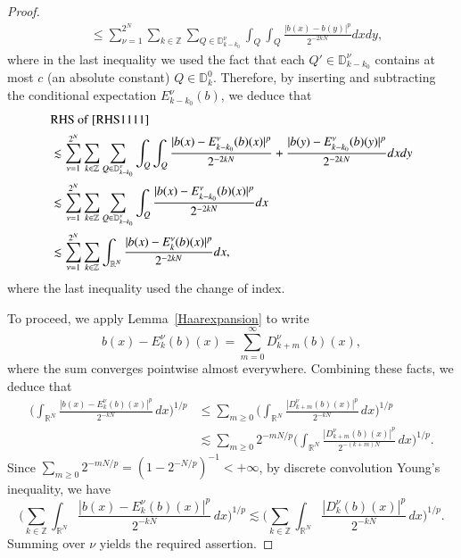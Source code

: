 \documentclass[12pt]{amsart}
\begin{document}
\begin{proof}
\begin{align}
   &\leq \sum_{\nu=1}^{2^N}\sum_{k\in\mathbb{Z}}\sum_{Q\in\mathbb{D}_{k-k_0}^\nu}\int_{Q}\int_{Q}\frac{|b(x)-b(y)|^p}{2^{-2kN}}dxdy,
\end{align}
where in the last inequality we used the fact that each $Q'\in \mathbb{D}_{k-k_0}^\nu$ contains at most $c$ (an absolute constant) $Q\in\mathbb{D}_k^0$. 
Therefore, by inserting and subtracting the conditional expectation $E_{k-k_0}^\nu(b)$, we deduce that
\begin{align}
  &{\rm RHS}\ {\rm of}\ \eqref{RHS1111}\nonumber\\
  &\lesssim \sum_{\nu=1}^{2^N}\sum_{k\in\mathbb{Z}}\sum_{Q\in\mathbb{D}_{k-k_0}^\nu}\int_{Q}\int_{Q}\frac{|b(x)-E_{k-k_0}^\nu(b)(x)|^p}{2^{-2kN}}+\frac{|b(y)-E_{k-k_0}^\nu(b)(y)|^p}{2^{-2kN}}dxdy\nonumber\\
  &\lesssim\sum_{\nu=1}^{2^N}\sum_{k\in\mathbb{Z}}\sum_{Q\in\mathbb{D}_{k-k_0}^\nu}\int_{Q}\frac{|b(x)-E_{k-k_0}^\nu(b)(x)|^p}{2^{-2kN}}dx\nonumber\\
  &\lesssim\sum_{\nu=1}^{2^N}\sum_{k\in\mathbb{Z}}\int_{\mathbb{R}^N}\frac{|b(x)-E_{k}^\nu(b)(x)|^p}{2^{-2kN}}dx,
\end{align}
where the last inequality used the change of index.

To proceed, we apply  Lemma~\ref{Haarexpansion} to write
\[
b(x)-E_k^\nu (b)(x)=\sum_{m=0}^{\infty}D_{k+m}^\nu (b)(x),
\]
 where the sum converges pointwise almost everywhere. 
Combining these facts, we deduce that
\begin{align}\label{eq:A-k-new}
\Bigg(\int_{\mathbb{R}^N}\frac{|b(x)-E_k^\nu (b)(x)|^p}{2^{-kN}}\,dx\Bigg)^{\!1/p}
&\le \sum_{m\ge0}
\Bigg(\int_{\mathbb{R}^N}\frac{|D_{k+m}^\nu (b)(x)|^p}{2^{-kN}}\,dx\Bigg)^{\!1/p}\nonumber\\
&\lesssim \sum_{m\ge0}2^{-mN/p}\Bigg(\int_{\mathbb{R}^N}\frac{|D_{k+m}^\nu (b)(x)|^p}{2^{-(k+m)N}}\,dx\Bigg)^{\!1/p}.
\end{align}
Since $\sum_{m\geq 0}2^{-mN/p}=(1-2^{-N/p})^{-1}<+\infty$, by discrete convolution Young's inequality, we have
\[
\Bigg(\sum_{k\in\mathbb{Z}}\int_{\mathbb{R}^N}\frac{|b(x)-E_k^\nu (b)(x)|^p}{2^{-kN}}\,dx\Bigg)^{\!1/p}
\lesssim
\Bigg(\sum_{k\in\mathbb{Z}}\int_{\mathbb{R}^N}\frac{|D_{k}^\nu(b)(x)|^p}{2^{-kN}}\,dx\Bigg)^{\!1/p}.
\]
Summing over $\nu$ yields the required assertion.
\end{proof}
\end{document}
